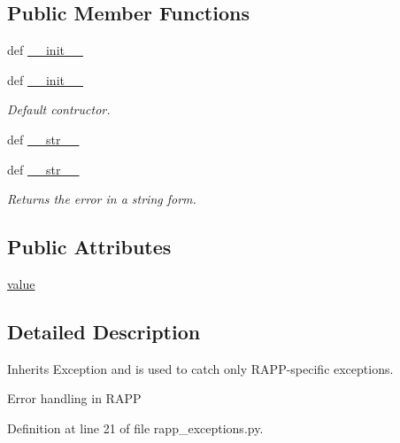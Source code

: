 \subsection*{Public Member Functions}
\begin{DoxyCompactItemize}
\item 
def \hyperlink{classrapp__exceptions_1_1RappError_a90a9797c509de106b6726f50866a1aaa}{\-\_\-\-\_\-init\-\_\-\-\_\-}
\item 
def \hyperlink{classrapp__exceptions_1_1RappError_a90a9797c509de106b6726f50866a1aaa}{\-\_\-\-\_\-init\-\_\-\-\_\-}
\begin{DoxyCompactList}\small\item\em Default contructor. \end{DoxyCompactList}\item 
def \hyperlink{classrapp__exceptions_1_1RappError_aa91e207de1a5fba4ebaf1d4acb0d5951}{\-\_\-\-\_\-str\-\_\-\-\_\-}
\item 
def \hyperlink{classrapp__exceptions_1_1RappError_aa91e207de1a5fba4ebaf1d4acb0d5951}{\-\_\-\-\_\-str\-\_\-\-\_\-}
\begin{DoxyCompactList}\small\item\em Returns the error in a string form. \end{DoxyCompactList}\end{DoxyCompactItemize}
\subsection*{Public Attributes}
\begin{DoxyCompactItemize}
\item 
\hyperlink{classrapp__exceptions_1_1RappError_a4013bcf7e5d7231460c7715a6af02eef}{value}
\end{DoxyCompactItemize}


\subsection{Detailed Description}
Inherits Exception and is used to catch only R\-A\-P\-P-\/specific exceptions. 

\begin{DoxyVerb}Error handling in RAPP\end{DoxyVerb}
 

Definition at line 21 of file rapp\-\_\-exceptions.\-py.



